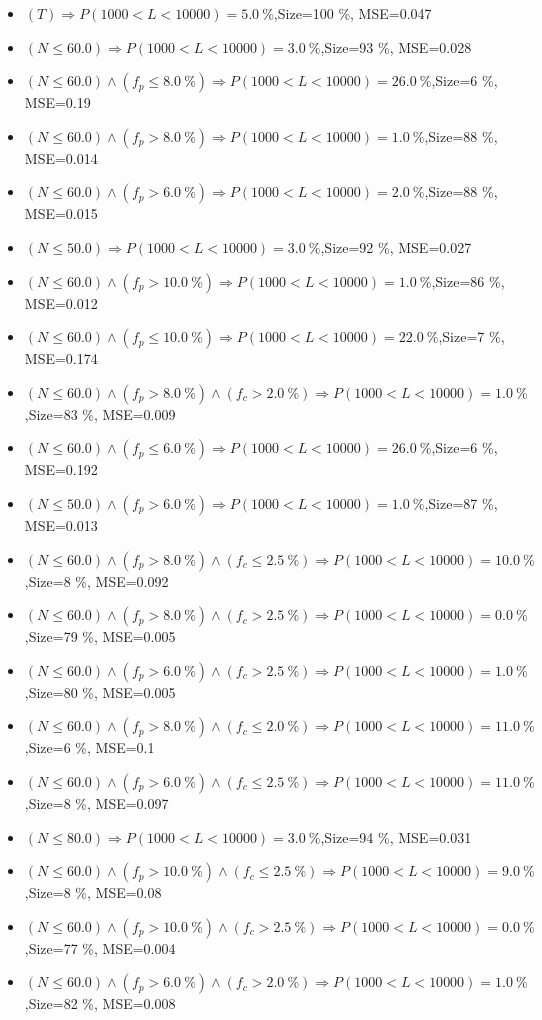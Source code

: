 \documentclass[numbered]{CSL}
\begin{document}
\begin{itemize}
\item $(T) \Rightarrow P(1 000 < L < 10 000) = 5.0~\%$,\hfill Size=100 \%, MSE=0.047
\item $(N \leq 60.0) \Rightarrow P(1 000 < L < 10 000) = 3.0~\%$,\hfill Size=93 \%, MSE=0.028
\item $(N \leq 60.0) \land (f_p \leq 8.0~\%) \Rightarrow P(1 000 < L < 10 000) = 26.0~\%$,\hfill Size=6 \%, MSE=0.19
\item $(N \leq 60.0) \land (f_p > 8.0~\%) \Rightarrow P(1 000 < L < 10 000) = 1.0~\%$,\hfill Size=88 \%, MSE=0.014
\item $(N \leq 60.0) \land (f_p > 6.0~\%) \Rightarrow P(1 000 < L < 10 000) = 2.0~\%$,\hfill Size=88 \%, MSE=0.015
\item $(N \leq 50.0) \Rightarrow P(1 000 < L < 10 000) = 3.0~\%$,\hfill Size=92 \%, MSE=0.027
\item $(N \leq 60.0) \land (f_p > 10.0~\%) \Rightarrow P(1 000 < L < 10 000) = 1.0~\%$,\hfill Size=86 \%, MSE=0.012
\item $(N \leq 60.0) \land (f_p \leq 10.0~\%) \Rightarrow P(1 000 < L < 10 000) = 22.0~\%$,\hfill Size=7 \%, MSE=0.174
\item $(N \leq 60.0) \land (f_p > 8.0~\%) \land (f_c > 2.0~\%) \Rightarrow P(1 000 < L < 10 000) = 1.0~\%$,\hfill Size=83 \%, MSE=0.009
\item $(N \leq 60.0) \land (f_p \leq 6.0~\%) \Rightarrow P(1 000 < L < 10 000) = 26.0~\%$,\hfill Size=6 \%, MSE=0.192
\item $(N \leq 50.0) \land (f_p > 6.0~\%) \Rightarrow P(1 000 < L < 10 000) = 1.0~\%$,\hfill Size=87 \%, MSE=0.013
\item $(N \leq 60.0) \land (f_p > 8.0~\%) \land (f_c \leq 2.5~\%) \Rightarrow P(1 000 < L < 10 000) = 10.0~\%$,\hfill Size=8 \%, MSE=0.092
\item $(N \leq 60.0) \land (f_p > 8.0~\%) \land (f_c > 2.5~\%) \Rightarrow P(1 000 < L < 10 000) = 0.0~\%$,\hfill Size=79 \%, MSE=0.005
\item $(N \leq 60.0) \land (f_p > 6.0~\%) \land (f_c > 2.5~\%) \Rightarrow P(1 000 < L < 10 000) = 1.0~\%$,\hfill Size=80 \%, MSE=0.005
\item $(N \leq 60.0) \land (f_p > 8.0~\%) \land (f_c \leq 2.0~\%) \Rightarrow P(1 000 < L < 10 000) = 11.0~\%$,\hfill Size=6 \%, MSE=0.1
\item $(N \leq 60.0) \land (f_p > 6.0~\%) \land (f_c \leq 2.5~\%) \Rightarrow P(1 000 < L < 10 000) = 11.0~\%$,\hfill Size=8 \%, MSE=0.097
\item $(N \leq 80.0) \Rightarrow P(1 000 < L < 10 000) = 3.0~\%$,\hfill Size=94 \%, MSE=0.031
\item $(N \leq 60.0) \land (f_p > 10.0~\%) \land (f_c \leq 2.5~\%) \Rightarrow P(1 000 < L < 10 000) = 9.0~\%$,\hfill Size=8 \%, MSE=0.08
\item $(N \leq 60.0) \land (f_p > 10.0~\%) \land (f_c > 2.5~\%) \Rightarrow P(1 000 < L < 10 000) = 0.0~\%$,\hfill Size=77 \%, MSE=0.004
\item $(N \leq 60.0) \land (f_p > 6.0~\%) \land (f_c > 2.0~\%) \Rightarrow P(1 000 < L < 10 000) = 1.0~\%$,\hfill Size=82 \%, MSE=0.008
\end{itemize}
\end{document}

